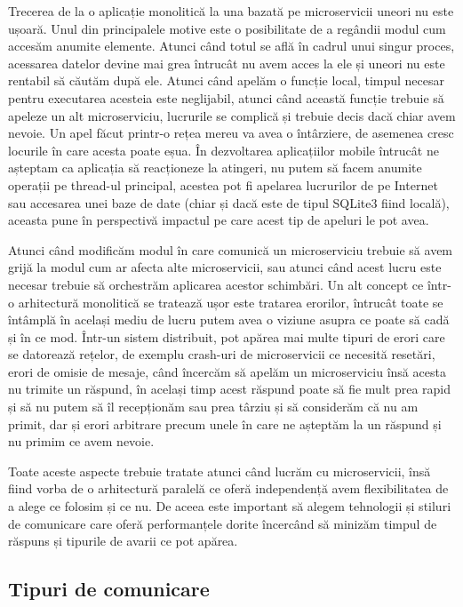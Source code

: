 Trecerea de la o aplicație monolitică la una bazată pe microservicii uneori nu este
ușoară. Unul din principalele motive este o posibilitate de a regândii modul cum accesăm
anumite elemente. Atunci când totul se află în cadrul unui singur proces, acessarea datelor
devine mai grea întrucât nu avem acces la ele și uneori nu este rentabil să căutăm după ele.
Atunci când apelăm o funcție local, timpul necesar pentru executarea acesteia este neglijabil,
atunci când această funcție trebuie să apeleze un alt microserviciu, lucrurile se complică și
trebuie decis dacă chiar avem nevoie. Un apel făcut printr-o rețea mereu va avea o întârziere, de asemenea
cresc locurile în care acesta poate eșua. În dezvoltarea aplicațiilor mobile întrucât 
ne așteptam ca aplicația să reacționeze la atingeri, nu putem să facem anumite operații pe
thread-ul principal, acestea pot fi apelarea lucrurilor de pe Internet sau accesarea unei baze
de date (chiar și dacă este de tipul SQLite3 fiind locală), aceasta pune în perspectivă 
impactul pe care acest tip de apeluri le pot avea.

Atunci când modificăm modul în care comunică un microserviciu trebuie să avem grijă la modul
cum ar afecta alte microservicii, sau atunci când acest lucru este necesar trebuie să orchestrăm
aplicarea acestor schimbări. Un alt concept ce într-o arhitectură monolitică se tratează ușor
este tratarea erorilor, întrucât toate se întâmplă în același mediu de lucru putem avea o viziune
asupra ce poate să cadă și în ce mod. Într-un sistem distribuit, pot apărea mai multe tipuri
de erori care se datorează rețelor, de exemplu crash-uri de microservicii ce necesită resetări,
erori de omisie de mesaje, când încercăm să apelăm un microserviciu însă acesta nu trimite un răspund,
în același timp acest răspund poate să fie mult prea rapid și să nu putem să îl recepționăm
sau prea târziu și să considerăm că nu am primit, dar și erori arbitrare precum unele în care 
ne așteptăm la un răspund și nu primim ce avem nevoie.

Toate aceste aspecte trebuie tratate atunci când lucrăm cu microservicii, însă fiind vorba
de o arhitectură paralelă ce oferă independență avem flexibilitatea de a alege ce folosim și ce nu.
De aceea este important să alegem tehnologii și stiluri de comunicare care oferă 
performanțele dorite încercând să minizăm timpul de răspuns și tipurile de avarii ce pot apărea.

\subsection{Tipuri de comunicare}


